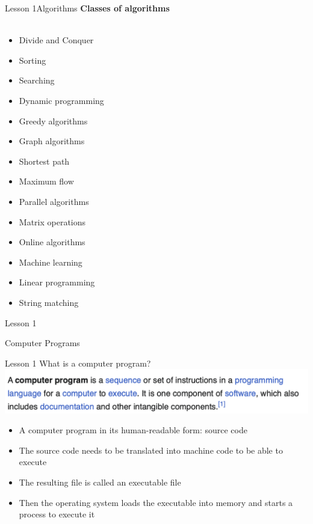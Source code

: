 \documentclass[aspectratio=1610]{beamer}
\begin{document}
\begin{frame}{Lesson 1}{Algorithms}
\Large
\textbf{Classes of algorithms}\\~\\ 
    \begin{multicols}{3}
    \begin{itemize}
        \item Divide and Conquer
        \item Sorting
        \item Searching
        \item Dynamic programming
        \item Greedy algorithms
        \item Graph algorithms
        \item Shortest path
        \item Maximum flow
        \item Parallel algorithms
        \item Matrix operations
        \item Online algorithms
        \item Machine learning
        \item Linear programming
        \item String matching
    \end{itemize}
    \end{multicols}
\end{frame}



\begin{frame}{Lesson 1}{}
\begin{center}
\Huge Computer Programs
\end{center}
\end{frame}


\begin{frame}{Lesson 1}{}
{\Huge{What is a computer program?}}
\includegraphics[scale=0.67]{Images/program}

\Large{
\begin{itemize}
    \item A computer program in its human-readable form: source code
    \item The source code needs to be translated into machine code to be able to execute
    \item The resulting file is called an executable file
    \item Then the operating system loads the executable into memory and starts a process to execute it
\end{itemize}}

\end{frame}
\end{document}
